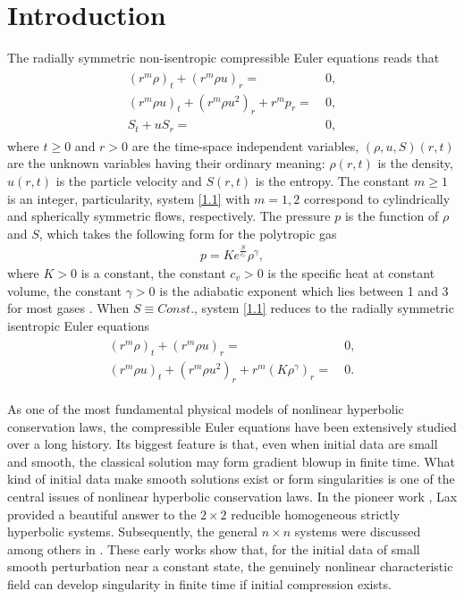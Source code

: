 \documentclass[11pt,reqno]{article}
\numberwithin{equation}{section}
\begin{document}
\section{Introduction}\label{S1}

The radially symmetric non-isentropic compressible Euler equations reads that \cite{courant}
\begin{align}\label{1.1}
\begin{split}
(r^m\rho)_t+(r^m\rho u)_r=&\ 0, \\
(r^m\rho u)_t+(r^m\rho u^2)_r+ r^m p_r=&\ 0, \\
S_t+uS_r=&\ 0,
\end{split}
\end{align}
where $t\geq0$ and $r>0$ are the time-space independent variables, $(\rho, u, S)(r,t)$ are the unknown variables having their ordinary meaning: $\rho(r,t)$ is the density, $u(r,t)$ is the particle velocity and $S(r,t)$ is the entropy. The constant $m\geq1$ is an integer, particularity, system \eqref{1.1} with $m=1,2$ correspond to cylindrically and spherically symmetric flows, respectively. The pressure $p$ is the function of $\rho$ and $S$, which takes the following form for the polytropic gas
\begin{align}\label{1.2}
p=Ke^{\frac{S}{c_v}}\rho^\gamma,
\end{align}
where $K>0$ is a constant, the constant $c_v>0$ is the specific heat at constant volume, the constant $\gamma>0$ is the adiabatic exponent which lies between 1 and 3 for most gases \cite{courant, smoller}. When $S\equiv Const.$, system \eqref{1.1} reduces to the radially symmetric isentropic Euler equations
\begin{align}\label{1.3}
\begin{split}
(r^m\rho)_t+(r^m\rho u)_r=&\ 0, \\
(r^m\rho u)_t+(r^m\rho u^2)_r+ r^m (K\rho^\gamma)_r=&\ 0.
\end{split}
\end{align}

As one of the most fundamental physical models of nonlinear hyperbolic conservation laws, the
compressible Euler equations have been extensively studied over a long history. Its biggest feature is that, even when initial data are small and smooth, the classical solution may form gradient blowup in finite time. What kind of initial data make smooth solutions exist or form singularities is one of the central issues of nonlinear hyperbolic conservation laws. In the pioneer work \cite{lax2}, Lax provided a beautiful answer to the $2\times2$ reducible homogeneous strictly hyperbolic systems. Subsequently, the general $n\times n$ systems were discussed among others in \cite{Ali, Schen, John, Kong, LZK, Liu1}. These early works show that, for the initial data of small smooth perturbation near a constant state, the genuinely nonlinear characteristic field can develop singularity in finite time if initial compression exists.
\end{document}
